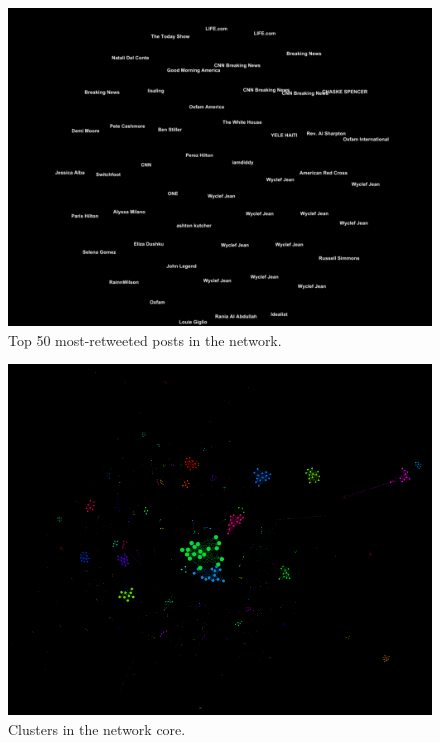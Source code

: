 \documentclass[a4paper, 11pt, titlepage]{article}
\begin{document}
\begin{figure}[h]
\centering
\label{fig:rt_net_top_50}
\includegraphics[width=120mm]{../figures/rt_net_top_50_tweets}
\caption{Top 50 most-retweeted posts in the network.}
\end{figure}

\begin{figure}[h]
\centering
\label{fig:rt_net_core_clusters}
\includegraphics[width=120mm]{../figures/rt_net_core_clusters}
\caption{Clusters in the network core.}
\end{figure}
\end{document}
